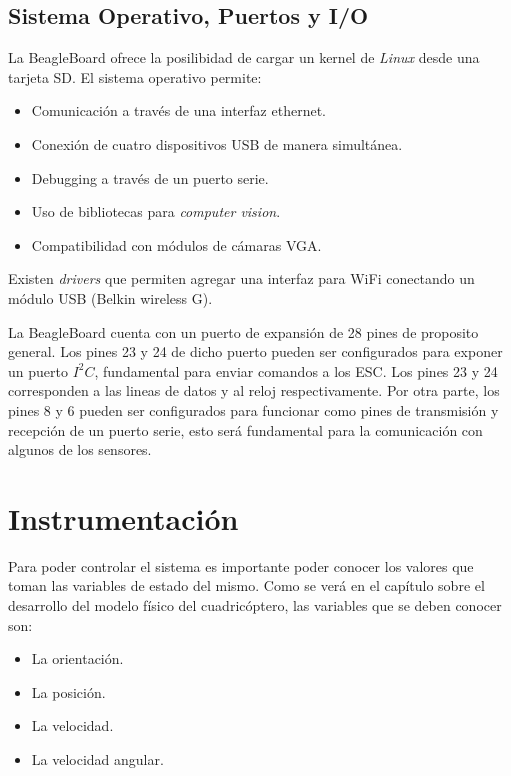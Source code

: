 \documentclass[main]{subfiles}
\begin{document}
\subsection*{Sistema Operativo, Puertos y I/O}

La BeagleBoard ofrece la posilibidad de cargar un kernel de \emph{Linux} desde una tarjeta SD. El sistema operativo permite:
\begin{itemize}
\item Comunicaci\'on a trav\'es de una interfaz ethernet.
\item Conexi\'on de cuatro dispositivos USB de manera simult\'anea.
\item Debugging a trav\'es de un puerto serie.
\item Uso de bibliotecas para \emph{computer vision}.
\item Compatibilidad con m\'odulos de c\'amaras VGA.
\end{itemize}

Existen \textit{drivers} que permiten agregar una interfaz para WiFi conectando un m\'odulo USB (Belkin wireless G).

La BeagleBoard cuenta con un puerto de expansi\'on de 28 pines de proposito general. Los pines 23 y 24 de dicho puerto pueden ser configurados para exponer un puerto $I^2C$, fundamental para enviar comandos a los ESC. Los pines 23 y 24 corresponden a las lineas de datos y al reloj respectivamente. Por otra parte, los pines 8 y 6 pueden ser configurados para funcionar como pines de transmisi\'on y recepci\'on de un puerto serie, esto ser\'a fundamental para la comunicaci\'on con algunos de los sensores.

\section{Instrumentaci\'on}

Para poder controlar el sistema es importante poder conocer los valores que toman las variables de estado del mismo. Como se ver\'a en el cap\'itulo sobre el desarrollo del modelo f\'isico del cuadric\'optero, las variables que se deben conocer son:

\begin{itemize}
\item La orientaci\'on.
\item La posici\'on.
\item La velocidad.
\item La velocidad angular.
\end{itemize}
\end{document}
